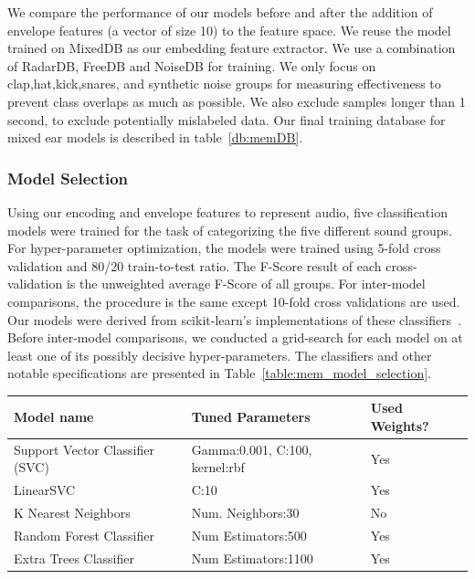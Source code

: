 \documentclass[runningheads,a4paper]{llncs}
\begin{document}
\begin{appendices}
 We compare the performance of our models before and after the addition of envelope features (a vector of size 10) to the feature space. We reuse the model trained on  MixedDB as our embedding feature extractor. We use a combination of RadarDB, FreeDB and NoiseDB for training. We only focus on clap,hat,kick,snares, and synthetic noise groups for measuring effectiveness to prevent class overlaps as much as possible. We also exclude samples longer than 1 second, to exclude potentially mislabeled data. Our final training database for mixed ear models is described in table~\ref{db:memDB}.

\subsubsection{Model Selection}
Using our encoding and envelope features to represent audio, five classification models were trained for the task of categorizing the five different sound groups. For hyper-parameter optimization, the models were trained using 5-fold cross validation and 80/20 train-to-test ratio. The F-Score result of each cross-validation is the unweighted average F-Score of all groups. For inter-model comparisons, the procedure is the same except 10-fold cross validations are used. Our models were derived from scikit-learn's implementations of these classifiers~\cite{pedregosa2011scikit}. Before inter-model comparisons, we conducted a grid-search for each model on at least one of its possibly decisive hyper-parameters. The classifiers and other notable specifications are presented in Table~\ref{table:mem_model_selection}. 
\begin{table}[t]
    \centering \hspace*{-0.8cm}
    \begin{threeparttable}
    \begin{tabular}[width=0.95\paperwidth]{|l|l|l|}
    \hline
    Model name & Tuned Parameters\tnote{\dag}  & Used Weights? \tnote{\ddag} \\\hline
     Support Vector Classifier (SVC) &  Gamma:0.001, C:100, kernel:rbf & Yes\\
     LinearSVC & C:10 & Yes\\
     K Nearest Neighbors & Num. Neighbors:30 &  No \\
     Random Forest Classifier & Num Estimators:500 & Yes \\
     Extra Trees Classifier & Num Estimators:1100 & Yes\\
     \hline
    \end{tabular}

\end{threeparttable}
\end{table}
\end{appendices}
\end{document}
